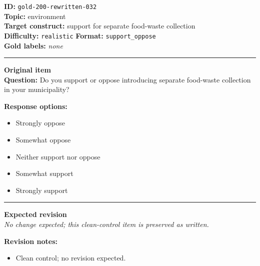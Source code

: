 \documentclass[10pt,a4paper]{article}
\newcommand{\sectionline}{\vspace{0.15em}\hrule\vspace{0.35em}}
\begin{document}
\begin{tcolorbox}[colframe=CleanGreen,colback=white,colbacktitle=CleanGreen!9,coltitle=black,title={Item 032\hfill Clean control}]
\textbf{ID:} \texttt{gold-200-rewritten-032}\\
\textbf{Topic:} environment\\
\textbf{Target construct:} support for separate food-waste collection\\
\textbf{Difficulty:} \texttt{realistic} \quad \textbf{Format:} \texttt{support\_oppose}\\
\textbf{Gold labels:} \textit{none}\\
\sectionline
\textbf{Original item}\\
\textbf{Question:} Do you support or oppose introducing separate food-waste collection in your municipality?
\par\textbf{Response options:}
\begin{itemize}
\item Strongly oppose
\item Somewhat oppose
\item Neither support nor oppose
\item Somewhat support
\item Strongly support
\end{itemize}
\sectionline
\textbf{Expected revision}\\
\textit{No change expected; this clean-control item is preserved as written.}
\par\textbf{Revision notes:}
\begin{itemize}
\item Clean control; no revision expected.
\end{itemize}
\end{tcolorbox}
\end{document}
